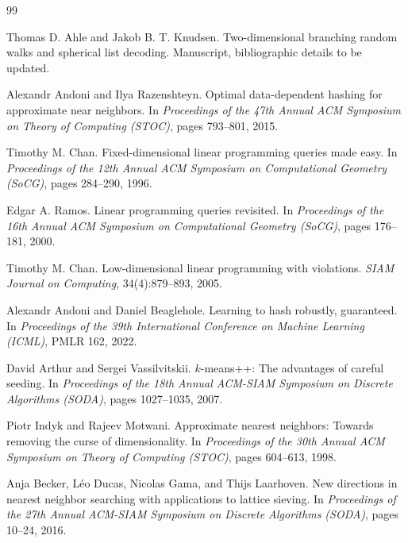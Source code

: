 \documentclass[10pt]{article}
\theoremstyle{definition}
\begin{document}
\begin{thebibliography}{99}

   Thomas D. Ahle and Jakob B. T. Knudsen.
   \newblock Two-dimensional branching random walks and spherical list decoding.
   \newblock Manuscript, bibliographic details to be updated.

   Alexandr Andoni and Ilya Razenshteyn.
   \newblock Optimal data-dependent hashing for approximate near neighbors.
   \newblock In \emph{Proceedings of the 47th Annual ACM Symposium on Theory of Computing (STOC)}, pages 793--801, 2015.

   Timothy M. Chan.
   \newblock Fixed-dimensional linear programming queries made easy.
   \newblock In \emph{Proceedings of the 12th Annual ACM Symposium on
   Computational Geometry (SoCG)}, pages 284--290, 1996.

   Edgar A. Ramos.
   \newblock Linear programming queries revisited.
   \newblock In \emph{Proceedings of the 16th Annual ACM Symposium on
   Computational Geometry (SoCG)}, pages 176--181, 2000.

   Timothy M. Chan.
   \newblock Low-dimensional linear programming with violations.
   \newblock \emph{SIAM Journal on Computing}, 34(4):879--893, 2005.

   Alexandr Andoni and Daniel Beaglehole.
   \newblock Learning to hash robustly, guaranteed.
   \newblock In \emph{Proceedings of the 39th International Conference on Machine Learning (ICML)}, PMLR 162, 2022.

   David Arthur and Sergei Vassilvitskii.
   \newblock \(k\)-means++: The advantages of careful seeding.
   \newblock In \emph{Proceedings of the 18th Annual ACM-SIAM Symposium on
   Discrete Algorithms (SODA)}, pages 1027--1035, 2007.

   Piotr Indyk and Rajeev Motwani.
   \newblock Approximate nearest neighbors: Towards removing the curse of dimensionality.
   \newblock In \emph{Proceedings of the 30th Annual ACM Symposium on Theory of Computing (STOC)}, pages 604--613, 1998.

   Anja Becker, L\'eo Ducas, Nicolas Gama, and Thijs Laarhoven.
   \newblock New directions in nearest neighbor searching with applications to
   lattice sieving.
   \newblock In \emph{Proceedings of the 27th Annual ACM-SIAM Symposium on
   Discrete Algorithms (SODA)}, pages 10--24, 2016.


\end{thebibliography}
\end{document}
